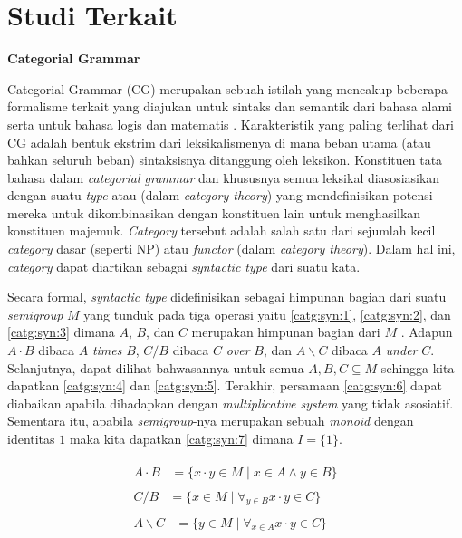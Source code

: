 \section{Studi Terkait}

\noindent\textbf{Categorial Grammar}

Categorial Grammar (CG) merupakan sebuah istilah yang mencakup beberapa formalisme terkait yang diajukan
untuk sintaks dan semantik dari bahasa alami serta untuk bahasa logis dan matematis \citep{Steedman92catg}.
Karakteristik yang paling terlihat dari CG adalah bentuk ekstrim dari leksikalismenya di mana beban utama
(atau bahkan seluruh beban) sintaksisnya ditanggung oleh leksikon.
Konstituen tata bahasa dalam \textit{categorial grammar} dan khususnya semua leksikal diasosiasikan
dengan suatu \textit{type} atau  (dalam \textit{category theory}) yang
mendefinisikan potensi mereka untuk dikombinasikan dengan konstituen lain untuk menghasilkan konstituen
majemuk.
\textit{Category} tersebut adalah salah satu dari sejumlah kecil \textit{category} dasar (seperti NP)
atau \textit{functor} (dalam \textit{category theory}).
Dalam hal ini, \textit{category} dapat diartikan sebagai \textit{syntactic type} dari suatu kata.

Secara formal, \textit{syntactic type} didefinisikan sebagai himpunan bagian dari suatu
\textit{semigroup} $M$ yang tunduk pada tiga operasi yaitu \ref{catg:syn:1},
\ref{catg:syn:2}, dan \ref{catg:syn:3} dimana $A$, $B$, dan $C$ merupakan himpunan bagian dari $M$
\citep{Lambek1988}. Adapun $A \cdot B$ dibaca $A$ \textit{times} $B$, $C/B$ dibaca $C$ \textit{over}
$B$, dan $A\backslash{}C$ dibaca $A$ \textit{under} $C$. Selanjutnya, dapat dilihat bahwasannya
untuk semua $A, B, C \subseteq M$ sehingga kita dapatkan \ref{catg:syn:4} dan \ref{catg:syn:5}.
Terakhir, persamaan \ref{catg:syn:6} dapat diabaikan apabila dihadapkan dengan
\textit{multiplicative system} yang tidak asosiatif. Sementara itu, apabila \textit{semigroup}-nya
merupakan sebuah \textit{monoid} dengan identitas $1$ maka kita dapatkan \ref{catg:syn:7} dimana
$I = \{1\}$.

\begin{align}
  \begin{split}\label{catg:syn:1}
    A \cdot B & = \{x \cdot y \in M \mid x \in A \land y \in B\}
  \end{split}\\
  \begin{split}\label{catg:syn:2}
    C/B & = \{x \in M \mid \forall_{y \in B} x \cdot y \in C\}
  \end{split}\\
  \begin{split}\label{catg:syn:3}
    A\backslash{}C & = \{y \in M \mid \forall_{x \in A} x \cdot y \in C\}
  \end{split}
\end{align}

